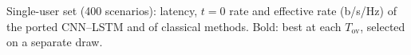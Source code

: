 \begin{table}[t]
\centering
\caption{Single-user set (400 scenarios): latency, $t=0$ rate and effective rate (b/s/Hz) of the ported CNN--LSTM and of classical methods. Bold: best at each $T_{\mathrm{ov}}$, selected on a separate draw.}
\label{tab:cnn}
\footnotesize
\setlength{\tabcolsep}{4pt}

\end{table}

